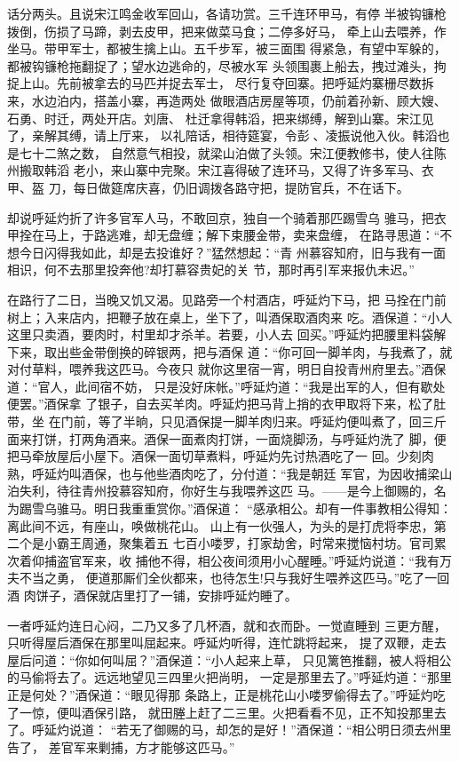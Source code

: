 话分两头。且说宋江鸣金收军回山，各请功赏。三千连环甲马，有停
半被钩镰枪拨倒，伤损了马蹄，剥去皮甲，把来做菜马食；二停多好马，
牵上山去喂养，作坐马。带甲军士，都被生擒上山。五千步军，被三面围
得紧急，有望中军躲的，都被钩镰枪拖翻捉了；望水边逃命的，尽被水军
头领围裹上船去，拽过滩头，拘捉上山。先前被拿去的马匹并捉去军士，
尽行复夺回寨。把呼延灼寨栅尽数拆来，水边泊内，搭盖小寨，再造两处
做眼酒店房屋等项，仍前着孙新、顾大嫂、石勇、时迁，两处开店。刘唐、
杜迁拿得韩滔，把来绑缚，解到山寨。宋江见了，亲解其缚，请上厅来，
以礼陪话，相待筵宴，令彭、凌振说他入伙。韩滔也是七十二煞之数，
自然意气相投，就梁山泊做了头领。宋江便教修书，使人往陈州搬取韩滔
老小，来山寨中完聚。宋江喜得破了连环马，又得了许多军马、衣甲、盔
刀，每日做筵席庆喜，仍旧调拨各路守把，提防官兵，不在话下。

却说呼延灼折了许多官军人马，不敢回京，独自一个骑着那匹踢雪乌
骓马，把衣甲拴在马上，于路逃难，却无盘缠；解下束腰金带，卖来盘缠，
在路寻思道：“不想今日闪得我如此，却是去投谁好？”猛然想起：“青
州慕容知府，旧与我有一面相识，何不去那里投奔他?却打慕容贵妃的关
节，那时再引军来报仇未迟。”

在路行了二日，当晚又饥又渴。见路旁一个村酒店，呼延灼下马，把
马拴在门前树上；入来店内，把鞭子放在桌上，坐下了，叫酒保取酒肉来
吃。酒保道：“小人这里只卖酒，要肉时，村里却才杀羊。若要，小人去
回买。”呼延灼把腰里料袋解下来，取出些金带倒换的碎银两，把与酒保
道：“你可回一脚羊肉，与我煮了，就对付草料，喂养我这匹马。今夜只
就你这里宿一宵，明日自投青州府里去。”酒保道：“官人，此间宿不妨，
只是没好床帐。”呼延灼道：“我是出军的人，但有歇处便罢。”酒保拿
了银子，自去买羊肉。呼延灼把马背上捎的衣甲取将下来，松了肚带，坐
在门前，等了半晌，只见酒保提一脚羊肉归来。呼延灼便叫煮了，回三斤
面来打饼，打两角酒来。酒保一面煮肉打饼，一面烧脚汤，与呼延灼洗了
脚，便把马牵放屋后小屋下。酒保一面切草煮料，呼延灼先讨热酒吃了一
回。少刻肉熟，呼延灼叫酒保，也与他些酒肉吃了，分付道：“我是朝廷
军官，为因收捕梁山泊失利，待往青州投慕容知府，你好生与我喂养这匹
马。——是今上御赐的，名为踢雪乌骓马。明日我重重赏你。”酒保道：
“感承相公。却有一件事教相公得知：离此间不远，有座山，唤做桃花山。
山上有一伙强人，为头的是打虎将李忠，第二个是小霸王周通，聚集着五
七百小喽罗，打家劫舍，时常来搅恼村坊。官司累次着仰捕盗官军来，收
捕他不得，相公夜间须用小心醒睡。”呼延灼说道：“我有万夫不当之勇，
便道那厮们全伙都来，也待怎生!只与我好生喂养这匹马。”吃了一回酒
肉饼子，酒保就店里打了一铺，安排呼延灼睡了。

一者呼延灼连日心闷，二乃又多了几杯酒，就和衣而卧。一觉直睡到
三更方醒，只听得屋后酒保在那里叫屈起来。呼延灼听得，连忙跳将起来，
提了双鞭，走去屋后问道：“你如何叫屈？”酒保道：“小人起来上草，
只见篱笆推翻，被人将相公的马偷将去了。远远地望见三四里火把尚明，
一定是那里去了。”呼延灼道：“那里正是何处？”酒保道：“眼见得那
条路上，正是桃花山小喽罗偷得去了。”呼延灼吃了一惊，便叫酒保引路，
就田塍上赶了二三里。火把看看不见，正不知投那里去了。呼延灼说道：
“若无了御赐的马，却怎的是好！”酒保道：“相公明日须去州里告了，
差官军来剿捕，方才能够这匹马。”

